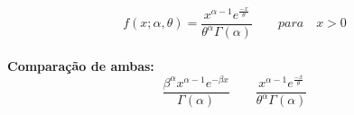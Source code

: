 \begin{equation}
f(x; \alpha, \theta )=\frac{x^{\alpha-1}e^{\frac{-x}{\theta}}}{\theta^{\alpha}\Gamma(\alpha)} \qquad para \quad x > 0
\end{equation}\\

\textbf{Comparação de ambas:}\\

\begin{equation}
\frac{\beta^{\alpha}x^{\alpha-1}e^{-\beta x}}{\Gamma(\alpha)} \qquad \frac{x^{\alpha-1}e^{\frac{-x}{\theta}}}{\theta^{\alpha}\Gamma(\alpha)}
\end{equation}





